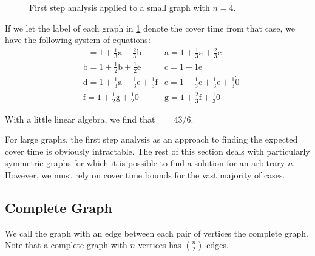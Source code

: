 \documentclass[12pt]{article}
\theoremstyle{definition}
\DeclareMathOperator{\tcov}{t_\textrm{cov}}      %
\begin{document}
\begin{figure}[ht]
	\caption{First step analysis applied to a small graph with $n=4$.}\label{fig:example}
\end{figure}

If we let the label of each graph in \cref{fig:example}
denote the cover time from that case, we have the following system
of equations:
\begin{align}
&\tcov = 1 + \frac{1}{3}\textrm{a} + \frac{2}{3}\textrm{b}
&\textrm{a} = 1 + \frac{1}{3}\textrm{a} + \frac{2}{3}\textrm{c} \nonumber \\
&\textrm{b} = 1 + \frac{1}{2}\textrm{b} + \frac{1}{2}\textrm{e}
&\textrm{c} = 1 + 1\textrm{e} \nonumber \\
&\textrm{d} = 1 + \frac{1}{3}\textrm{a} + \frac{1}{3}\textrm{e} + \frac{1}{3}\textrm{f}
&\textrm{e} = 1 + \frac{1}{3}\textrm{c} + \frac{1}{3}\textrm{e} + \frac{1}{3}\dot 0\nonumber \\
&\textrm{f} = 1 + \frac{1}{2}\textrm{g} + \frac{1}{2}\dot 0
&\textrm{g} = 1 + \frac{2}{3}\textrm{f} + \frac{1}{3}\dot 0\nonumber
\end{align}

With a little linear algebra, we find that $\tcov = 43/6$.

For large graphs, the first step analysis as an approach to finding the expected
cover time is obviously intractable.
The rest of this section deals with particularly symmetric graphs
for which it is possible to find a solution for an arbitrary $n$.
However, we must rely on cover time bounds for the vast majority of cases.

\subsection{Complete Graph}\label{sec:complete}
We call the graph with an edge between each pair of vertices the
complete graph.
Note that a complete graph with $n$ vertices has ${n \choose 2}$ edges.
\end{document}

